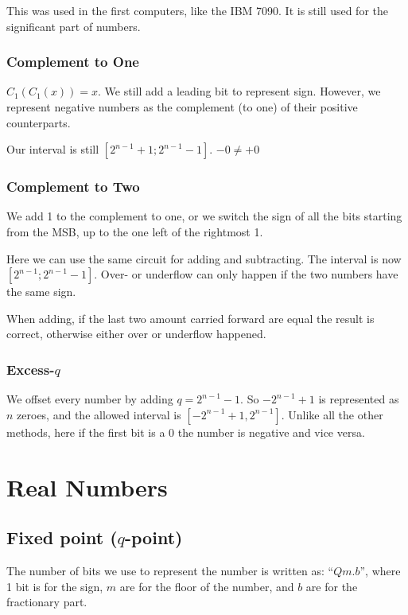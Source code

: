 \documentclass[12pt,a4paper]{report}
\numberwithin{equation}{section}
\theoremstyle{definition}
\theoremstyle{remark}
\begin{document}
This was used in the first computers, like the IBM 7090. It is still used for the significant part of numbers.

\subsubsection{Complement to One}

$C_1 (C_1 (x))=x$. We still add a leading bit to represent sign. However, we represent negative numbers as the complement (to one) of their positive counterparts.

Our interval is still $[2^{n-1}+1; 2^{n-1}-1]$. $-0\neq +0$

\subsubsection{Complement to Two}

We add 1 to the complement to one, or we switch the sign of all the bits starting from the MSB, up to the one left of the rightmost 1.

Here we can use the same circuit for adding and subtracting. The interval is now $[2^{n-1}; 2^{n-1}-1]$. Over- or underflow can only happen if the two numbers have the same sign.

When adding, if the last two amount carried forward are equal the result is correct, otherwise either over or underflow happened.

\subsubsection{Excess-$q$}

We offset every number by adding $q=2^{n-1}-1$. So $-2^{n-1}+1$ is represented as $n$ zeroes, and the allowed interval is $[-2^{n-1}+1, 2^{n-1}]$. Unlike all the other methods, here if the first bit is a 0 the number is negative and vice versa.

\section{Real Numbers}

\subsection{Fixed point ($q$-point)}

The number of bits we use to represent the number is written as: ``$Qm.b$'', where 1 bit is for the sign, $m$ are for the floor of the number, and $b$ are for the fractionary part.
\end{document}
